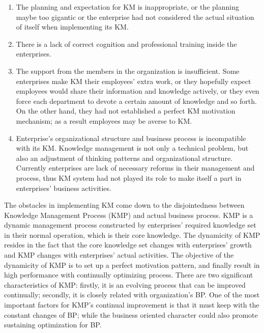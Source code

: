 \documentclass{elsarticle}
\begin{document}
\begin{enumerate}
\item  The planning and expectation for KM is inappropriate, or the
planning maybe too gigantic or the enterprise had not considered the
actual situation of itself when implementing its KM.
\item  There is a lack of correct cognition and professional
training inside the enterprises.
\item The support from the members in the organization is
insufficient. Some enterprises make KM their
employees' extra work, or they hopefully expect
employees would share their information and knowledge actively, or they
even force each department to devote a certain amount of knowledge and
so forth. On the other hand, they had not established a perfect KM
motivation mechanism; as a result employees may be averse to KM.
 \item Enterprise's organizational structure and
business process is incompatible with its KM. Knowledge management is not
only a technical problem, but also an adjustment of thinking patterns
and organizational structure. Currently enterprises are lack of
necessary reforms in their management and process, thus KM system had
not played its role to make itself a part in
enterprises' business activities.
\end{enumerate}



The obstacles in implementing KM come down to the disjointedness
between Knowledge Management Process (KMP) and actual business process.
KMP is a dynamic management process constructed by
enterprises' required knowledge set in their normal
operation, which is their core knowledge. The dynamicity of KMP resides
in the fact that the core knowledge set changes with
enterprises' growth and KMP changes with
enterprises' actual activities. The objective of the
dynamicity of KMP is to set up a perfect motivation pattern, and
finally result in high performance with continually optimizing process.
There are two significant characteristics of KMP: firstly, it is an
evolving process that can be improved continually; secondly, it is
closely related with organization's BP. One of the
most important factors for KMP's continual improvement
is that it must keep with the constant changes of BP; while the
business oriented character could also promote sustaining optimization
for BP.
\end{document}
